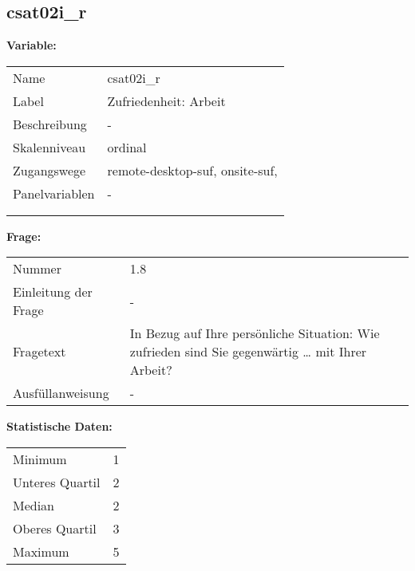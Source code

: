 	
	
	\subsection{csat02i\_r}
	\label{subSection:csat02i_r}

	\noindent\textbf{Variable:}\\
		\begin{tabular}{lL{11.3cm}}
			\label{tableVariable:csat02i_r}
			Name & csat02i\_r \\
			Label & Zufriedenheit: Arbeit \\
			Beschreibung & - \\
			Skalenniveau & ordinal \\
			Zugangswege &
				remote-desktop-suf,
				onsite-suf,
 \\
			Panelvariablen & -
			 \\
			 \\
 \\
		\end{tabular}

		\vspace*{1 cm}
		\noindent\textbf{Frage:}\\
		\begin{tabular}{lL{11.3cm}}
			\label{tableQuestion:csat02i_r}
			Nummer & 1.8 \\
			Einleitung der Frage & - \\
			Fragetext & In Bezug auf Ihre persönliche Situation: Wie zufrieden sind Sie gegenwärtig …
mit Ihrer Arbeit? \\
			Ausfüllanweisung & - \\
		\end{tabular}


		\vspace*{1 cm}
		\noindent\textbf{Statistische Daten:}\\
			\begin{tabular}{ll}
				\label{tableStatistics:csat02i_r}
					Minimum & 1 \\
					Unteres Quartil & 2 \\
					Median & 2 \\
					Oberes Quartil & 3 \\
					Maximum & 5 \\
			\end{tabular}



